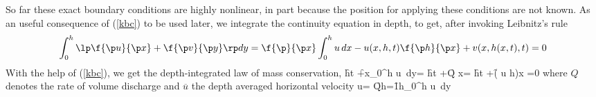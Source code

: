 So far these exact boundary conditions are highly nonlinear,  in part because the position for applying these conditions are not known. As an useful consequence of  (\ref{kbc}) to be used later, we  
integrate the continuity equation in depth, to get, after invoking Leibnitz's rule 
\[ \int_0^h\lp \f{\p u}{\p x}+\f{\p v}{\p y}\rp dy= \f{\p}{\p x}  \int_0^h u\, dx -  u(x,h,t)\f{\p h}{\p x} +v(x,h(x,t),t)=  0 \]
With the help of  (\ref{kbc}), we get the depth-integrated law of mass conservation,
\be \f{\p h}{\p t} +\f{\p}{\p x}\lp \int_0^h u\, dy\rp = \f{\p h}{\p t} +\f{\p Q }{\p x}= \f{\p h}{\p t} +\f{\p (   {\overline u} h)}{\p x} =0 \label{int-mass}\ee
where $Q$ denotes the rate of volume discharge and $\overline u$   the depth averaged horizontal velocity
\be \overline u= \f{Q}{h}=\f{1}{h}\int_0^h u\, dy\ee
  
 

